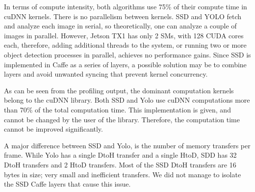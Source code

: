 In terms of compute intensity, both algorithms use 75\% of their compute time in cuDNN kernels. There is no parallelism between kernels. SSD and YOLO fetch and analyze each image in serial, so theoretically, one can analyze a couple of images in parallel. However, Jetson TX1 has only 2 SMs, with 128 CUDA cores each, therefore, adding additional threads to the system, or running two or more object detection processes in parallel, achieves no performance gains. Since SSD is implemented in Caffe as a series of layers, a possible solution may be to combine layers and avoid unwanted syncing that prevent kernel concurrency.

As can be seen from the profiling output, the dominant computation kernels belong to the cuDNN library. Both SSD and Yolo use cuDNN computations more than 70\% of the total computation time. This implementation is given, and cannot be changed by the user of the library. Therefore, the computation time cannot be improved significantly.

A major difference between SSD and Yolo, is the number of memory transfers per frame. While Yolo has a single DtoH transfer and a single HtoD, SDD has 32 DtoH transfers and 2 HtoD transfers. Most of the SSD DtoH transfers are 16 bytes in size; very small and inefficient transfers. We did not manage to isolate the SSD Caffe layers that cause this issue.  



